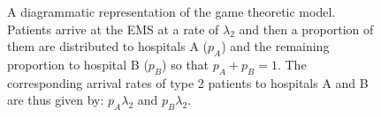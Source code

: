 \begin{figure}[H]
\begin{minipage}{.55\textwidth}
    \end{minipage}
    \caption{A diagrammatic representation of the game theoretic model.
    Patients arrive at the EMS at a rate of \( \lambda_2 \) and then a
    proportion of them are distributed to hospitals A (\(p_A\)) and the
    remaining proportion to hospital B (\(p_B\)) so that \(p_A + p_B = 1\).
    The corresponding arrival rates of type 2 patients to hospitals A and B are
    thus given by: \( p_A \lambda_2 \) and \( p_B \lambda_2 \).}
    \label{fig:diagram_of_game_theoretic_model}
\end{figure}